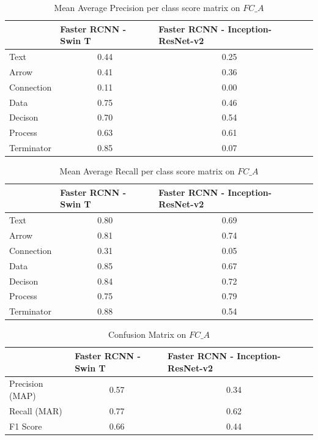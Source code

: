 
\begin{table}
    \caption{Mean Average Precision per class score matrix on $FC\_A$}
    \label{tab:Map per class score}
    \centering
        \begin{tabular}{lccl}
        \hline
         & \multicolumn{1}{l}{Faster RCNN - Swin T} & \multicolumn{1}{l}{Faster RCNN - Inception-ResNet-v2} \\ \hline
        Text       & 0.44 & 0.25   \\
        Arrow      & 0.41 & 0.36   \\
        Connection & 0.11 & 0.00   \\
        Data       & 0.75 & 0.46   \\
        Decison    & 0.70 & 0.54   \\
        Process    & 0.63 & 0.61   \\
        Terminator & 0.85 & 0.07   \\ \hline
        \end{tabular}
\end{table}

\begin{table}
    \caption{Mean Average Recall per class score matrix on $FC\_A$}
    \label{tab:Mar per class score}
    \centering
        \begin{tabular}{lccl}
        \hline
         & \multicolumn{1}{l}{Faster RCNN - Swin T} & \multicolumn{1}{l}{Faster RCNN - Inception-ResNet-v2} \\ \hline
        Text       & 0.80 & 0.69   \\
        Arrow      & 0.81 & 0.74   \\
        Connection & 0.31 & 0.05   \\
        Data       & 0.85 & 0.67   \\
        Decison    & 0.84 & 0.72   \\
        Process    & 0.75 & 0.79   \\
        Terminator & 0.88 & 0.54   \\ \hline
        \end{tabular}
\end{table}

\begin{table}
    \caption{Confusion Matrix on $FC\_A$}
    \centering
    \label{tab:Confusion matrix}
        \begin{tabular}{lccl}
        \hline
         & \multicolumn{1}{l}{Faster RCNN - Swin T} & \multicolumn{1}{l}{Faster RCNN - Inception-ResNet-v2}  \\ \hline
        Precision (MAP) & 0.57 & 0.34   \\
        Recall (MAR)    & 0.77 & 0.62   \\
        F1 Score        & 0.66 & 0.44   \\ \hline
        \end{tabular}   
\end{table}

